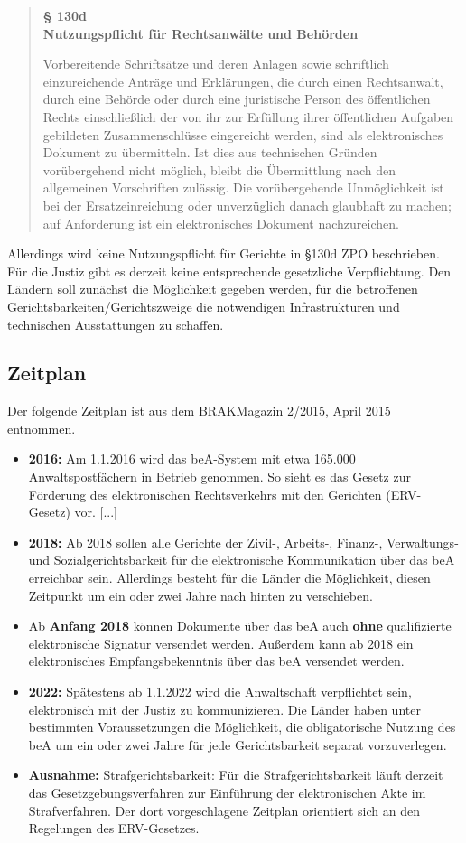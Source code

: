 \begin{quote}
	\begin{center}
		\textbf{§ 130d} \\
		\textbf{Nutzungspflicht für Rechtsanwälte und Behörden}
	\end{center}
	Vorbereitende Schriftsätze und deren Anlagen sowie schriftlich einzureichende Anträge und Erklärungen, die durch einen Rechtsanwalt, durch eine Behörde oder durch eine juristische Person des öffentlichen Rechts einschließlich der von ihr zur Erfüllung ihrer öffentlichen Aufgaben gebildeten Zusammenschlüsse eingereicht werden, sind als elektronisches Dokument zu übermitteln. Ist dies aus technischen Gründen vorübergehend nicht möglich, bleibt die Übermittlung nach den allgemeinen Vorschriften zulässig. Die vorübergehende Unmöglichkeit ist bei der Ersatzeinreichung oder unverzüglich danach glaubhaft zu machen; auf Anforderung ist ein elektronisches Dokument nachzureichen.
\end{quote}

Allerdings wird keine Nutzungspflicht für Gerichte in §130d ZPO beschrieben. Für die Justiz gibt es derzeit keine entsprechende gesetzliche Verpflichtung. Den Ländern soll zunächst die Möglichkeit gegeben werden, für die betroffenen Gerichtsbarkeiten/Gerichtszweige die notwendigen Infrastrukturen und technischen Ausstattungen zu schaffen.

\subsection{Zeitplan}
Der folgende Zeitplan ist aus dem BRAKMagazin 2/2015, April 2015\textcite{bea:bea:brak2/2015} entnommen.
\begin{itemize}
\item \textbf{2016:} Am 1.1.2016 wird das beA-System mit etwa 165.000 Anwaltspostfächern in Betrieb genommen. So sieht es das Gesetz zur Förderung des elektronischen Rechtsverkehrs mit den Gerichten (ERV-Gesetz) vor. [...]
\item \textbf{2018:} Ab 2018 sollen alle Gerichte der Zivil-, Arbeits-, Finanz-, Verwaltungs- und Sozialgerichtsbarkeit für die elektronische Kommunikation über das beA erreichbar sein. Allerdings besteht für die Länder die Möglichkeit, diesen Zeitpunkt um ein oder zwei Jahre nach hinten zu verschieben.
\item Ab \textbf{Anfang 2018} können Dokumente über das beA auch \textbf{ohne} qualifizierte elektronische Signatur versendet werden. Außerdem kann ab 2018 ein elektronisches Empfangsbekenntnis über das beA versendet werden.
\item \textbf{2022:} Spätestens ab 1.1.2022 wird die Anwaltschaft verpflichtet sein, elektronisch mit der Justiz zu kommunizieren. Die Länder haben unter bestimmten Voraussetzungen die Möglichkeit, die obligatorische Nutzung des beA um ein oder zwei Jahre für jede Gerichtsbarkeit separat vorzuverlegen.
\item \textbf{Ausnahme:} Strafgerichtsbarkeit: Für die Strafgerichtsbarkeit läuft derzeit das Gesetzgebungsverfahren zur Einführung der elektronischen Akte im Strafverfahren. Der dort vorgeschlagene Zeitplan orientiert sich an den Regelungen des ERV-Gesetzes.
\end{itemize}

